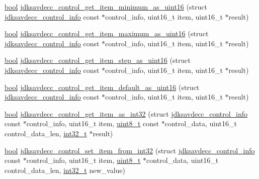 \begin{DoxyCompactItemize}
\item 
\hyperlink{avb__gptp_8h_af6a258d8f3ee5206d682d799316314b1}{bool} \hyperlink{group__aem__control__value__helpers_ga25bbfe20290d66d926f13b93bae3bd3b}{jdksavdecc\+\_\+control\+\_\+get\+\_\+item\+\_\+minimum\+\_\+as\+\_\+uint16} (struct \hyperlink{structjdksavdecc__control__info}{jdksavdecc\+\_\+control\+\_\+info} const $\ast$control\+\_\+info, uint16\+\_\+t item, uint16\+\_\+t $\ast$result)
\item 
\hyperlink{avb__gptp_8h_af6a258d8f3ee5206d682d799316314b1}{bool} \hyperlink{group__aem__control__value__helpers_ga6816d0060b9a61df876c889953ed2a34}{jdksavdecc\+\_\+control\+\_\+get\+\_\+item\+\_\+maximum\+\_\+as\+\_\+uint16} (struct \hyperlink{structjdksavdecc__control__info}{jdksavdecc\+\_\+control\+\_\+info} const $\ast$control\+\_\+info, uint16\+\_\+t item, uint16\+\_\+t $\ast$result)
\item 
\hyperlink{avb__gptp_8h_af6a258d8f3ee5206d682d799316314b1}{bool} \hyperlink{group__aem__control__value__helpers_ga82b7e8594ed1692ebffa0fabc6949b36}{jdksavdecc\+\_\+control\+\_\+get\+\_\+item\+\_\+step\+\_\+as\+\_\+uint16} (struct \hyperlink{structjdksavdecc__control__info}{jdksavdecc\+\_\+control\+\_\+info} const $\ast$control\+\_\+info, uint16\+\_\+t item, uint16\+\_\+t $\ast$result)
\item 
\hyperlink{avb__gptp_8h_af6a258d8f3ee5206d682d799316314b1}{bool} \hyperlink{group__aem__control__value__helpers_ga88b2251598b2fc01dc4763c835029b53}{jdksavdecc\+\_\+control\+\_\+get\+\_\+item\+\_\+default\+\_\+as\+\_\+uint16} (struct \hyperlink{structjdksavdecc__control__info}{jdksavdecc\+\_\+control\+\_\+info} const $\ast$control\+\_\+info, uint16\+\_\+t item, uint16\+\_\+t $\ast$result)
\item 
\hyperlink{avb__gptp_8h_af6a258d8f3ee5206d682d799316314b1}{bool} \hyperlink{group__aem__control__value__helpers_ga4010c3abfd897039bd3e7f57a49edc13}{jdksavdecc\+\_\+control\+\_\+get\+\_\+item\+\_\+as\+\_\+int32} (struct \hyperlink{structjdksavdecc__control__info}{jdksavdecc\+\_\+control\+\_\+info} const $\ast$control\+\_\+info, uint16\+\_\+t item, \hyperlink{stdint_8h_aba7bc1797add20fe3efdf37ced1182c5}{uint8\+\_\+t} const $\ast$control\+\_\+data, uint16\+\_\+t control\+\_\+data\+\_\+len, \hyperlink{parse_8c_a37994e3b11c72957c6f454c6ec96d43d}{int32\+\_\+t} $\ast$result)
\item 
\hyperlink{avb__gptp_8h_af6a258d8f3ee5206d682d799316314b1}{bool} \hyperlink{group__aem__control__value__helpers_gae339ee8c1a55885f00b45ac8e1b0e897}{jdksavdecc\+\_\+control\+\_\+set\+\_\+item\+\_\+from\+\_\+int32} (struct \hyperlink{structjdksavdecc__control__info}{jdksavdecc\+\_\+control\+\_\+info} const $\ast$control\+\_\+info, uint16\+\_\+t item, \hyperlink{stdint_8h_aba7bc1797add20fe3efdf37ced1182c5}{uint8\+\_\+t} $\ast$control\+\_\+data, uint16\+\_\+t control\+\_\+data\+\_\+len, \hyperlink{parse_8c_a37994e3b11c72957c6f454c6ec96d43d}{int32\+\_\+t} new\+\_\+value)

\end{DoxyCompactItemize}
